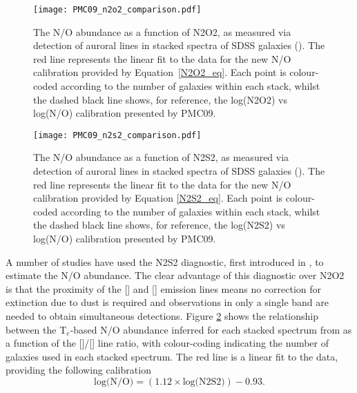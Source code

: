 \documentclass[usenatbib]{mnras} %
\begin{document}
\begin{figure}
    \centering
    \texttt{[image: PMC09\_n2o2\_comparison.pdf]}
    \caption{The N/O abundance as a function of N2O2, as measured via detection of auroral lines in stacked spectra of SDSS galaxies (\citealt{Curti_2017}). The red line represents the linear fit to the data for the new N/O calibration provided by Equation~\ref{N2O2_eq}. Each point is colour-coded according to the number of galaxies within each stack, whilst the dashed black line shows, for reference, the log(N2O2) vs log(N/O) calibration presented by PMC09.}
    \label{fig:N2O2_calib}
\end{figure}

\begin{figure}
    \texttt{[image: PMC09\_n2s2\_comparison.pdf]}
    \caption{The N/O abundance as a function of N2S2, as measured via detection of auroral lines in stacked spectra of SDSS galaxies (\citealt{Curti_2017}). The red line represents the linear fit to the data for the new N/O calibration provided by Equation \ref{N2S2_eq}. Each point is colour-coded according to the number of galaxies within each stack, whilst the dashed black line shows, for reference, the log(N2S2) vs log(N/O) calibration presented by PMC09.}
    \label{fig:N2S2_calib}
\end{figure}

A number of studies have used the N2S2 diagnostic, first introduced in \cite{Sabbadin_1977}, to estimate the N/O abundance. The clear advantage of this diagnostic over N2O2 is that the proximity of the [] and [] emission lines means no correction for extinction due to dust is required and observations in only a single band are needed to obtain simultaneous detections. Figure \ref{fig:N2S2_calib} shows the relationship between the T$_{e}$-based N/O abundance inferred for each stacked spectrum from \cite{Curti_2017} as a function of the []/[] line ratio, with colour-coding indicating the number of galaxies used in each stacked spectrum. The red line is a linear fit to the data, providing the following calibration
\begin{equation}\label{N2S2_eq}
\text{log(N/O)} = \left(1.12 \times \text{log(N2S2)}\right) - 0.93.
\end{equation}
\end{document}
